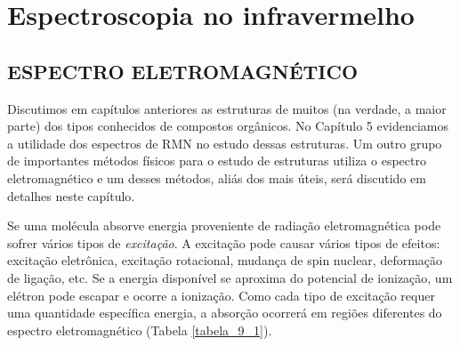 \chapter{Espectroscopia no infravermelho}

\section{ESPECTRO ELETROMAGNÉTICO}

Discutimos em capítulos anteriores as estruturas de muitos (na verdade, a maior parte) dos tipos conhecidos de compostos orgânicos. No Capítulo 5 evidenciamos a utilidade dos espectros de RMN no estudo dessas estruturas. Um outro grupo de importantes métodos físicos para o estudo de estruturas utiliza o espectro eletromagnético e um desses métodos, aliás dos mais úteis, será discutido em detalhes neste capítulo.

Se uma molécula absorve energia proveniente de radiação eletromagnética pode sofrer vários tipos de \textit{excitação}. A excitação pode causar vários tipos de efeitos: excitação eletrônica, excitação rotacional, mudança de spin nuclear, deformação de ligação, etc. Se a energia disponível se aproxima do potencial de ionização, um elétron pode escapar e ocorre a ionização. Como cada tipo de excitação requer uma quantidade específica energia, a absorção ocorrerá em regiões diferentes do espectro eletromagnético (Tabela \ref{tabela_9_1}).

